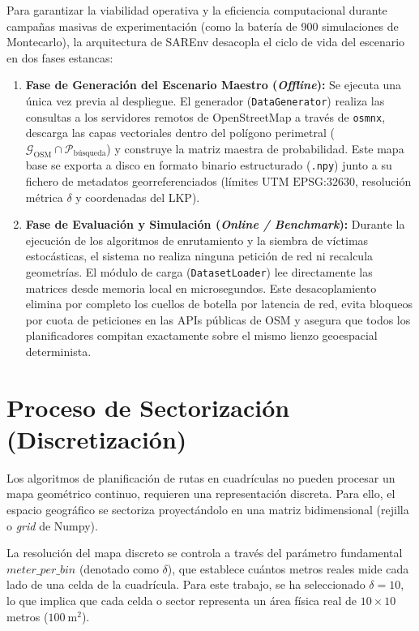 Para garantizar la viabilidad operativa y la eficiencia computacional durante campañas masivas de experimentación (como la batería de 900 simulaciones de Montecarlo), la arquitectura de SAREnv desacopla el ciclo de vida del escenario en dos fases estancas:
\begin{enumerate}
    \item \textbf{Fase de Generación del Escenario Maestro (\textit{Offline}):} 
    Se ejecuta una única vez previa al despliegue. El generador (\texttt{DataGenerator}) realiza las consultas a los servidores remotos de OpenStreetMap a través de \texttt{osmnx}, descarga las capas vectoriales dentro del polígono perimetral ($\mathcal{G}_{\text{OSM}} \cap \mathcal{P}_{\text{búsqueda}}$) y construye la matriz maestra de probabilidad. Este mapa base se exporta a disco en formato binario estructurado (\texttt{.npy}) junto a su fichero de metadatos georreferenciados (límites UTM $\text{EPSG:32630}$, resolución métrica $\delta$ y coordenadas del LKP).
    
    \item \textbf{Fase de Evaluación y Simulación (\textit{Online / Benchmark}):} 
    Durante la ejecución de los algoritmos de enrutamiento y la siembra de víctimas estocásticas, el sistema no realiza ninguna petición de red ni recalcula geometrías. El módulo de carga (\texttt{DatasetLoader}) lee directamente las matrices desde memoria local en microsegundos. Este desacoplamiento elimina por completo los cuellos de botella por latencia de red, evita bloqueos por cuota de peticiones en las APIs públicas de OSM y asegura que todos los planificadores compitan exactamente sobre el mismo lienzo geoespacial determinista.
\end{enumerate}

\section{Proceso de Sectorización (Discretización)}

Los algoritmos de planificación de rutas en cuadrículas no pueden procesar un mapa geométrico continuo, requieren una representación discreta. Para ello, el espacio geográfico se sectoriza proyectándolo en una matriz bidimensional (rejilla o \textit{grid} de Numpy).

La resolución del mapa discreto se controla a través del parámetro fundamental $meter\_per\_bin$ (denotado como $\delta$), que establece cuántos metros reales mide cada lado de una celda de la cuadrícula. Para este trabajo, se ha seleccionado $\delta = 10$, lo que implica que cada celda o sector representa un área física real de $10 \times 10$ metros ($100~\text{m}^2$).

